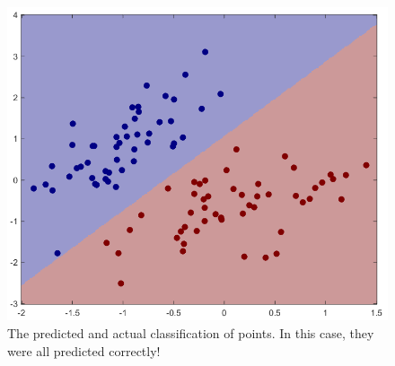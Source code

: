 \documentclass[twoside,11pt]{article}
\theoremstyle{definition}
\begin{document}
\begin{figure}[h]
\centering
\includegraphics[width=5 in]{prob1fPlotA2.png}
\caption{The predicted and actual classification of points. In this case, they were all predicted correctly!}
\end{figure}
\end{document}
